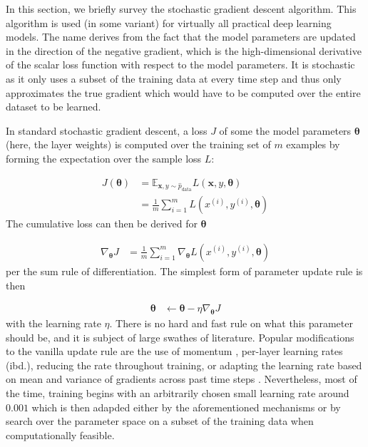 In this section, we briefly survey the stochastic gradient descent algorithm.
This algorithm is used (in some variant) for virtually all practical deep
learning models. The name derives from the fact that the model parameters are
updated in the direction of the negative gradient, which is the high-dimensional
derivative of the scalar loss function with respect to the model parameters. It
is stochastic as it only uses a subset of the training data at every time step
and thus only approximates the true gradient which would have to be computed
over the entire dataset to be learned.

In standard stochastic gradient descent, a loss $J$ of some the
model parameters $\boldsymbol\theta$ (here, the layer weights) is computed over the training set of $m$
examples by forming the expectation over the sample loss $L$:

\begin{align}
    J(\boldsymbol\theta) &= \mathbb{E}_{\mathbf{x},y\sim\hat{p}_{\text{data}}} L(\mathbf{x}, y, \boldsymbol\theta) \\
                         &= \frac{1}{m}\sum_{i=1}^{m}L(x^{(i)}, y^{(i)}, \boldsymbol\theta)
\end{align}
The cumulative loss can then be derived for $\boldsymbol\theta$

\begin{align}
    \nabla_{\boldsymbol\theta}J &= \frac{1}{m}\sum_{i=1}^{m}\nabla_{\boldsymbol\theta}L(x^{(i)}, y^{(i)}, \boldsymbol\theta)
\end{align}
per the sum rule of differentiation. The simplest form of parameter update rule
is then

\begin{align}
    \boldsymbol\theta &\leftarrow \boldsymbol\theta - \eta \nabla_{\boldsymbol\theta}J
\end{align}
with the learning rate $\eta$. There is no hard and fast rule on what this
parameter should be, and it is subject of large swathes of literature. Popular
modifications to the vanilla update rule are the use of momentum
\citep{jacobs1988increased}, per-layer learning rates (ibd.), reducing the rate
throughout training, or adapting the
learning rate based on mean and variance of gradients across past time steps
\citep{kingma2014adam}. Nevertheless, most of the time, training begins with an
arbitrarily chosen small learning rate around $0.001$ which is then adapded
either by the aforementioned mechanisms or by search over the parameter space on
a subset of the training data when computationally feasible.


